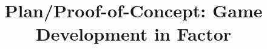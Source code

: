 \documentclass{sig-alternate}
\begin{document}
 \sloppy

%

\title{Plan/Proof-of-Concept: Game Development in Factor}
%
%
%
%
%
\end{document}
